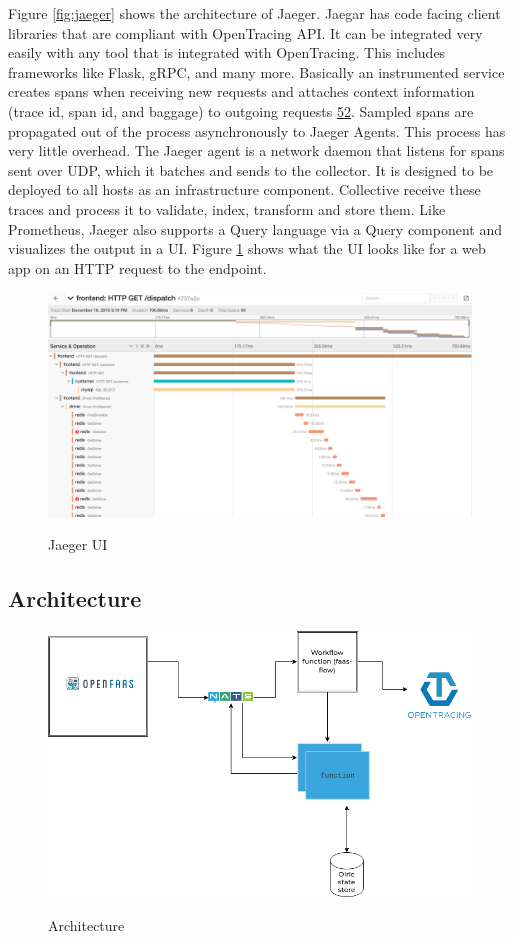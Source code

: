 \documentclass[12pt,titlepage]{article}
\begin{document}
Figure \ref{fig:jaeger} shows the architecture of Jaeger. Jaegar has code facing client libraries
that are compliant with OpenTracing API. It can be integrated very easily with
any tool that is integrated with OpenTracing. This includes frameworks like
Flask, gRPC, and many more. Basically an instrumented service creates spans when
receiving new requests and attaches context information (trace id, span id, and
baggage) to outgoing requests \hyperref[ref:52]{52}. Sampled spans are propagated out of
the process asynchronously to Jaeger Agents. This process has very little
overhead. The Jaeger agent is a network daemon that listens for spans sent over
UDP, which it batches and sends to the collector. It is designed to be deployed
to all hosts as an infrastructure component. Collective receive these traces and
process it to validate, index, transform and store them. Like Prometheus, Jaeger
also supports a Query language via a Query component and visualizes the output
in a UI. Figure \ref{fig:jaeger_traces} shows what the UI looks like for a web app on an HTTP request to
the endpoint. 
\begin{figure}[!h]
    \caption{Jaeger UI}
    \centering
    \includegraphics[width=130mm]{./thesis_images/jaeger_traces.png}
    \label{fig:jaeger_traces}
\end{figure}

\subsection{Architecture}
\label{sec:org1af2ac3}
\begin{figure}[!h]
    \caption{Architecture}
    \centering
    \includegraphics[width=130mm]{./thesis_images/architecture.png}
    \label{fig:arch}
\end{figure}
\end{document}
